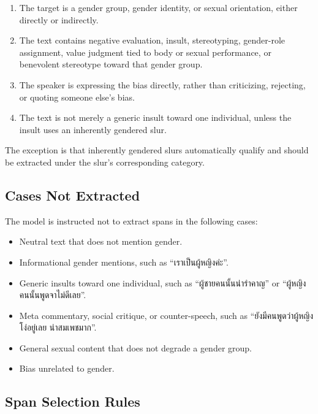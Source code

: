\documentclass[12pt,oneside,openright,a4paper]{cpe-english-project}
\begin{document}
\begin{enumerate}
\setlength{\itemsep}{0.15\baselineskip}
\setlength{\parsep}{0pt}
\setlength{\parskip}{0pt}
\def\labelenumi{(\Alph{enumi})}
\item The target is a gender group, gender identity, or sexual orientation,
either directly or indirectly.
\item The text contains negative evaluation, insult, stereotyping,
gender-role assignment, value judgment tied to body or sexual performance,
or benevolent stereotype toward that gender group.
\item The speaker is expressing the bias directly, rather than criticizing,
rejecting, or quoting someone else's bias.
\item The text is not merely a generic insult toward one individual, unless
the insult uses an inherently gendered slur.
\end{enumerate}

The exception is that inherently gendered slurs automatically qualify and
should be extracted under the slur's corresponding category.

\subsection{Cases Not Extracted}

The model is instructed not to extract spans in the following cases:

\begin{itemize}
\setlength{\itemsep}{0.15\baselineskip}
\setlength{\parsep}{0pt}
\setlength{\parskip}{0pt}
\item Neutral text that does not mention gender.
\item Informational gender mentions, such as ``เราเป็นผู้หญิงค่ะ''.
\item Generic insults toward one individual, such as
``ผู้ชายคนนั้นน่ารำคาญ'' or ``ผู้หญิงคนนั้นพูดจาไม่ดีเลย''.
\item Meta commentary, social critique, or counter-speech, such as
``ยังมีคนพูดว่าผู้หญิงโง่อยู่เลย น่าสมเพชมาก''.
\item General sexual content that does not degrade a gender group.
\item Bias unrelated to gender.
\end{itemize}

\subsection{Span Selection Rules}
\end{document}
